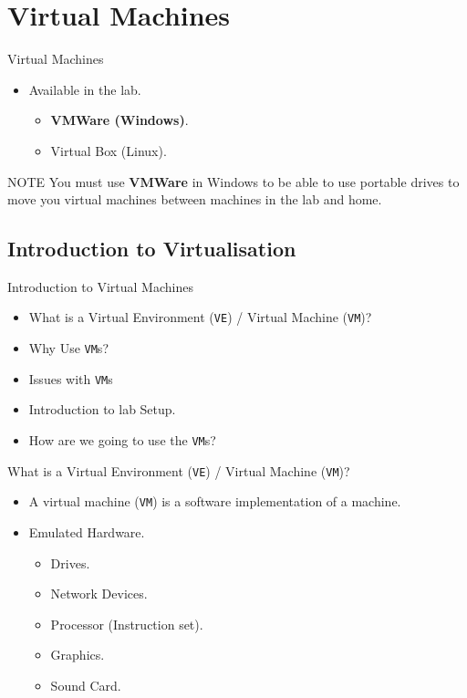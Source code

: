 \documentclass{beamer}
\begin{document}
\section{Virtual Machines}
\begin{frame}{Virtual Machines}
  \begin{itemize}
    \item Available in the lab.
      \begin{itemize}
        \item \textbf{VMWare (Windows)}.
        \item Virtual Box (Linux).
      \end{itemize}
  \end{itemize}
  \begin{block}{NOTE}
    You must use \textbf{VMWare} in Windows to be able to use portable drives to move you virtual machines between machines in the lab and home. 
  \end{block}
\end{frame}

\subsection{Introduction to Virtualisation}
\begin{frame}{Introduction to Virtual Machines}
  \begin{itemize}
    \item What is a Virtual Environment (\texttt{VE}) / Virtual Machine (\texttt{VM})?
    \item Why Use \texttt{VM}s?
    \item Issues with \texttt{VM}s
    \item Introduction to lab Setup.
    \item How are we going to use the \texttt{VM}s?
  \end{itemize}
\end{frame}

\begin{frame}{What is a Virtual Environment (\texttt{VE}) / Virtual Machine (\texttt{VM})?}
  \begin{itemize}
    \item A virtual machine (\texttt{VM}) is a software implementation of a machine.
    \item Emulated Hardware.
    \begin{itemize}
      \item Drives.
      \item Network Devices.
      \item Processor (Instruction set).
      \item Graphics.
      \item Sound Card.
    \end{itemize}  
  \end{itemize}
\end{frame}
\end{document}
